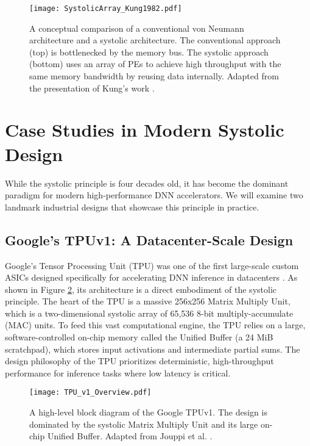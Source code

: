 \begin{figure}[htbp]
    \centering
    \texttt{[image: SystolicArray\_Kung1982.pdf]} 
    \caption[Conventional vs. Systolic Processing]{A conceptual comparison of a conventional von Neumann architecture and a systolic architecture. The conventional approach (top) is bottlenecked by the memory bus. The systolic approach (bottom) uses an array of PEs to achieve high throughput with the same memory bandwidth by reusing data internally. Adapted from the presentation of Kung's work \cite{kung1982systolic}.}
    \label{fig:conventional_vs_systolic}
\end{figure}

\section{Case Studies in Modern Systolic Design}
\label{sec:case_studies}
While the systolic principle is four decades old, it has become the dominant paradigm for modern high-performance DNN accelerators. We will examine two landmark industrial designs that showcase this principle in practice.

\subsection{Google's TPUv1: A Datacenter-Scale Design}
Google's Tensor Processing Unit (TPU) was one of the first large-scale custom ASICs designed specifically for accelerating DNN inference in datacenters \cite{jouppi2017tpu}. As shown in Figure \ref{fig:tpu_diagram}, its architecture is a direct embodiment of the systolic principle. The heart of the TPU is a massive 256x256 Matrix Multiply Unit, which is a two-dimensional systolic array of 65,536 8-bit multiply-accumulate (MAC) units. To feed this vast computational engine, the TPU relies on a large, software-controlled on-chip memory called the Unified Buffer (a 24 MiB scratchpad), which stores input activations and intermediate partial sums. The design philosophy of the TPU prioritizes deterministic, high-throughput performance for inference tasks where low latency is critical.

\begin{figure}[h!]
    \centering
    \texttt{[image: TPU\_v1\_Overview.pdf]} 
    \caption[The Google TPUv1 Block Diagram]{A high-level block diagram of the Google TPUv1. The design is dominated by the systolic Matrix Multiply Unit and its large on-chip Unified Buffer. Adapted from Jouppi et al. \cite{jouppi2017tpu, mittal2021survey}.}
    \label{fig:tpu_diagram}
\end{figure}

